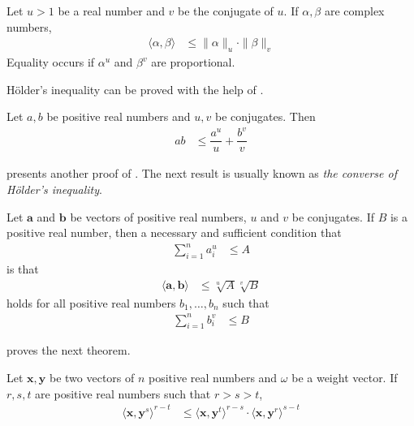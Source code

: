 \documentclass[inequalities.tex]{subfile}
\begin{document}
		\begin{theorem}\label{thm:holder}
			Let $u>1$ be a real number and $v$ be the conjugate of $u$. If $\alpha,\beta$ are complex numbers,
				\begin{align*}
					\langle\alpha,\beta\rangle
						& \leq \|\alpha\|_{u}\cdot\|\beta\|_{v}
				\end{align*}
			Equality occurs if $\alpha^{u}$ and $\beta^{v}$ are proportional.
		\end{theorem}
	H\"{o}lder's inequality can be proved with the help of \textcite{young_1912}.
		\begin{theorem}
			Let $a,b$ be positive real numbers and $u,v$ be conjugates. Then
				\begin{align*}
					ab
						& \leq \dfrac{a^{u}}{u}+\dfrac{b^{v}}{v}
				\end{align*}
		\end{theorem}
	\textcite{razminia_2019} presents another proof of . The next result is usually known as \textit{the converse of H\"{o}lder's inequality}.
		\begin{theorem}
			Let $\mathbf{a}$ and $\mathbf{b}$ be vectors of positive real numbers, $u$ and $v$ be conjugates.  If $B$ is a positive real number, then a necessary and sufficient condition that
				\begin{align*}
					\sum_{i=1}^{n}a_{i}^{u}
						& \leq A
				\end{align*}
			is that
				\begin{align*}
					\langle\mathbf{a},\mathbf{b}\rangle
						& \leq \sqrt[u]{A}\sqrt[v]{B}
				\end{align*}
			holds for all positive real numbers $b_{1},\ldots,b_{n}$ such that
				\begin{align*}
					\sum_{i=1}^{n}b_{i}^{v}
						& \leq B
				\end{align*}
		\end{theorem}
	\textcite{ljapunov_1901} proves the next theorem.
		\begin{theorem}
			Let $\mathbf{x},\mathbf{y}$ be two vectors of $n$ positive real numbers and $\omega$ be a weight vector. If $r,s,t$ are positive real numbers such that $r>s>t$,
				\begin{align*}
					\langle\mathbf{x},\mathbf{y}^{s}\rangle^{r-t}
						& \leq \langle\mathbf{x},\mathbf{y}^{t}\rangle^{r-s}\cdot\langle\mathbf{x},\mathbf{y}^{r}\rangle^{s-t}
				\end{align*}
		\end{theorem}
\end{document}
